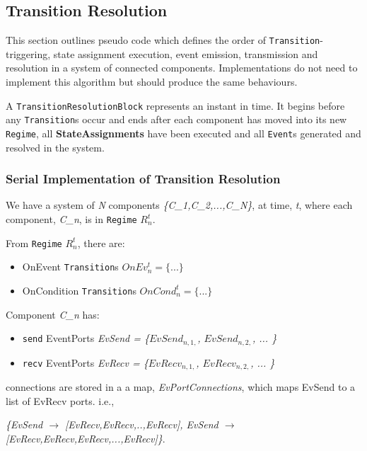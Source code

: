 \documentclass{article}
\begin{document}
\subsection{Transition Resolution}
\label{resolution}

This section outlines pseudo code which defines the order of
{\tt Transition}-triggering, state assignment execution, event emission,
transmission and resolution in a system of connected components.
Implementations do not need to implement this algorithm but should produce
the same behaviours.

A {\tt TransitionResolutionBlock} represents an instant in time. It begins
before any {\tt Transition}s occur and ends after each component has moved
into its new {\tt Regime}, all \textbf{StateAssignments} have been executed
and all {\tt Event}s generated and resolved in the system.

\subsubsection{Serial Implementation of Transition Resolution}

\newcommand{\CN}[0]{\textsl{C\_n}}

We have a system of \textsl{N} components \textsl{\{C\_1,C\_2,...,C\_N\}},
at time, \textsl{t}, where each component, \CN, is in {\tt Regime}
$R^{t}_{n}$.

\noindent From {\tt Regime} $R^{t}_{n}$, there are:
\begin{itemize}
\item OnEvent {\tt Transition}s $OnEv^{t}_{n} = \{ ... \}$
\item OnCondition {\tt Transition}s $OnCond^{t}_{n} = \{ ... \}$
\end{itemize}

\newcommand{\send}[0]{\texttt{send} }
\newcommand{\recv}[0]{\texttt{recv} }

\noindent Component \CN
has:
\begin{itemize}
\item \send EventPorts \textsl{EvSend = \{$EvSend_{n,1,}$, $EvSend_{n,2,}$, ...  \}}
\item \recv EventPorts \textsl{EvRecv = \{$EvRecv_{n,1,}$, $EvRecv_{n,2,}$, ...  \}}
\end{itemize}

 connections are stored in a a map,
\textsl{EvPortConnections}, which maps EvSend to a list of EvRecv ports. i.e.,

\textsl{\{EvSend $\rightarrow$ [EvRecv,EvRecv,..,EvRecv], EvSend $\rightarrow$
[EvRecv,EvRecv,EvRecv,...,EvRecv]\}}.
\end{document}
